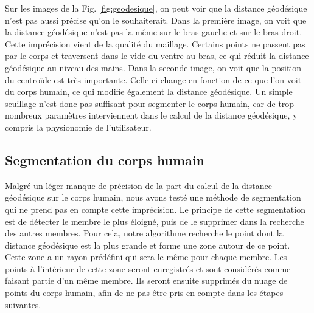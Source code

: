 Sur les images de la Fig. \ref{fig:geodesique}, on peut voir que la distance géodésique n'est pas aussi précise qu'on le souhaiterait.
Dans la première image, on voit que la distance géodésique n'est pas la même sur le bras gauche et sur le bras droit. Cette imprécision
vient de la qualité du maillage. Certains points ne passent pas par le corps et traversent dans le vide du ventre au bras, ce qui réduit
la distance géodésique au niveau des mains. Dans la seconde image, on voit que la position du centroïde est très importante. Celle-ci change en fonction de ce que l'on voit du corps humain, ce qui modifie également la distance géodésique. Un simple seuillage
n'est donc pas suffisant pour segmenter le corps humain, car de trop nombreux paramètres interviennent dans le calcul de la distance géodésique,
y compris la physionomie de l'utilisateur.

\subsection{Segmentation du corps humain}
Malgré un léger manque de précision de la part du calcul de la distance géodésique sur le corps humain, nous avons testé une
méthode de segmentation qui ne prend pas en compte cette imprécision. Le principe de cette segmentation est de détecter le
membre le plus éloigné, puis de le supprimer dans la recherche des autres membres. Pour cela, notre algorithme recherche le point
dont la distance géodésique est la plus grande et forme une zone autour de ce point. Cette zone a un rayon prédéfini qui sera le 
même pour chaque membre. Les points à l'intérieur de cette zone seront enregistrés et sont considérés comme faisant partie d'un 
même membre. Ils seront ensuite supprimés du nuage de points du corps humain, afin de ne pas être pris en compte dans les 
étapes suivantes.\\

